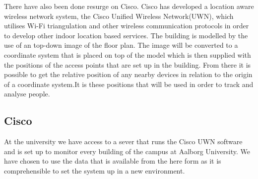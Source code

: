 There have also been done resurge on Cisco. Cisco has developed a location aware wireless network system, the Cisco Unified Wireless Network(UWN), which utilises Wi-Fi triangulation\cite{CiscoTri} and other wireless communication protocols in order to develop other indoor location based services\cite{uwn}. 
The building is modelled by the use of an top-down image of the floor plan. The image will be converted to a coordinate system that is placed on top of the model which is then supplied with the positions of the access points that are set up in the building. From there it is possible to get the relative position of any nearby devices in relation to the origin of a coordinate system.It is these positions that will be used in order to track and analyse people.

\subsection{Cisco}\label{subsec:cisco}
At the university we have access to a sever that runs the Cisco UWN software and is set up to monitor every building of the campus at Aalborg University. We have chosen to use the data that is available from the here form as it is comprehensible to set the system up in a new environment.


